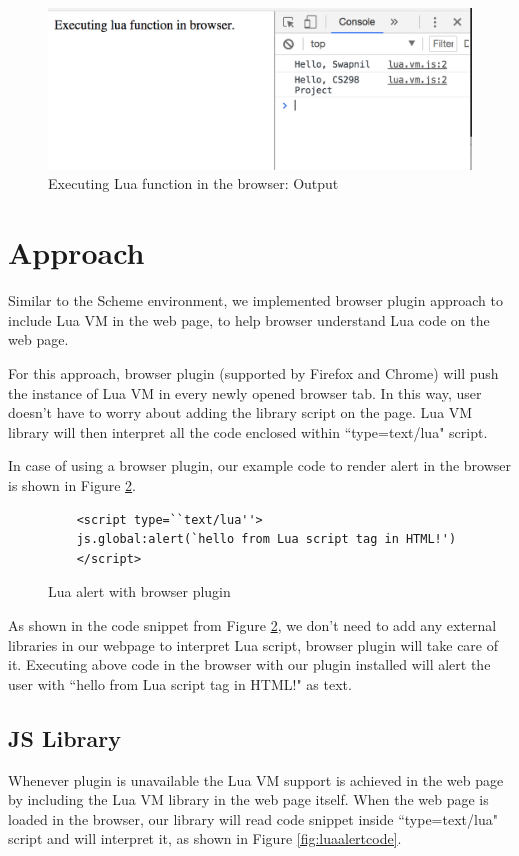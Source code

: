 \begin{figure}[H]
	\begin{center}
		\includegraphics[width=\linewidth]{./images/lua-functions.png}
	\end{center}
	\caption{Executing Lua function in the browser: Output}
	\label{fig:luafunction}
\end{figure}


\section{Approach}

Similar to the Scheme environment, we implemented browser plugin approach to include Lua VM in the web page, to help browser understand Lua code on the web page.

For this approach, browser plugin (supported by Firefox and Chrome) will push the instance of Lua VM in every newly opened browser tab. In this way, user doesn't have to worry about adding the library script on the page. Lua VM library will then interpret all the code enclosed within ``type=text/lua" script.

In case of using a browser plugin, our example code to render alert in the browser is shown in Figure \ref{fig:luaalertplugin}.

\begin{figure}[H]
	\begin{lstlisting}
	<script type=``text/lua''>
	js.global:alert(`hello from Lua script tag in HTML!') 
	</script>
	\end{lstlisting}
	\caption{Lua alert with browser plugin}
	\label{fig:luaalertplugin}
\end{figure}

As shown in the code snippet from Figure \ref{fig:luaalertplugin}, we don't need to add any external libraries in our webpage to interpret Lua script, browser plugin will take care of it.
Executing above code in the browser with our plugin installed will alert the user with ``hello from Lua script tag in HTML!" as text.


\subsection{JS Library}

Whenever plugin is unavailable the Lua VM support is achieved in the web page by including the Lua VM library in the web page itself. When the web page is loaded in the browser, our library will read code snippet inside ``type=text/lua" script and will interpret it, as shown in Figure \ref{fig:luaalertcode}.